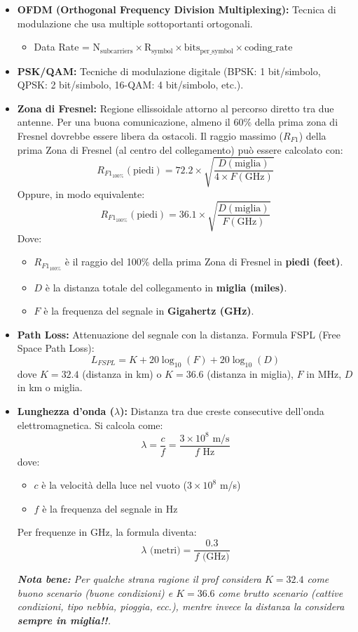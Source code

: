 \begin{itemize}
    \item \textbf{OFDM (Orthogonal Frequency Division Multiplexing):} Tecnica di modulazione che usa multiple sottoportanti ortogonali.
    \begin{itemize}
        \item Data Rate = $\text{N}_{\text{subcarriers}} \times \text{R}_{\text{symbol}} \times \text{bits}_{\text{per\_symbol}} \times \text{coding\_rate}$
    \end{itemize}
    \item \textbf{PSK/QAM:} Tecniche di modulazione digitale (BPSK: 1 bit/simbolo, QPSK: 2 bit/simbolo, 16-QAM: 4 bit/simbolo, etc.).
    \item \textbf{Zona di Fresnel:} Regione ellissoidale attorno al percorso diretto tra due antenne. Per una buona comunicazione, almeno il 60\% della prima zona di Fresnel dovrebbe essere libera da ostacoli. Il raggio massimo ($R_{F1}$) della prima Zona di Fresnel (al centro del collegamento) può essere calcolato con:
    \[ R_{F1_{\text{100\%}}} (\text{piedi}) = 72.2 \times \sqrt{\frac{D (\text{miglia})}{4 \times F (\text{GHz})}} \]
    Oppure, in modo equivalente:
    \[ R_{F1_{\text{100\%}}} (\text{piedi}) = 36.1 \times \sqrt{\frac{D (\text{miglia})}{F (\text{GHz})}} \]
    Dove:
    \begin{itemize}
        \item $R_{F1_{\text{100\%}}}$ è il raggio del 100\% della prima Zona di Fresnel in \textbf{piedi (feet)}.
        \item $D$ è la distanza totale del collegamento in \textbf{miglia (miles)}.
        \item $F$ è la frequenza del segnale in \textbf{Gigahertz (GHz)}.
    \end{itemize}
    \item \textbf{Path Loss:} Attenuazione del segnale con la distanza. Formula FSPL (Free Space Path Loss):
    \[ L_{FSPL} = K + 20\log_{10}(F) + 20\log_{10}(D) \]
    dove $K = 32.4$ (distanza in km) o $K = 36.6$ (distanza in miglia), $F$ in MHz, $D$ in km o miglia.

    \item \textbf{Lunghezza d'onda ($\lambda$):} Distanza tra due creste consecutive dell'onda elettromagnetica. Si calcola come:
    \[ \lambda = \frac{c}{f} = \frac{3 \times 10^8 \text{ m/s}}{f \text{ Hz}} \]
    dove:
    \begin{itemize}
        \item $c$ è la velocità della luce nel vuoto ($3 \times 10^8$ m/s)
        \item $f$ è la frequenza del segnale in Hz
    \end{itemize}
    Per frequenze in GHz, la formula diventa:
    \[ \lambda \text{ (metri)} = \frac{0.3}{f \text{ (GHz)}} \]

    \textit{\textbf{Nota bene:} Per qualche strana ragione il prof considera $K = 32.4$ come buono scenario (buone condizioni) e $K = 36.6$ come brutto scenario (cattive condizioni, tipo nebbia, pioggia, ecc.), mentre invece la distanza la considera \textbf{sempre in miglia!!}.}
\end{itemize}


